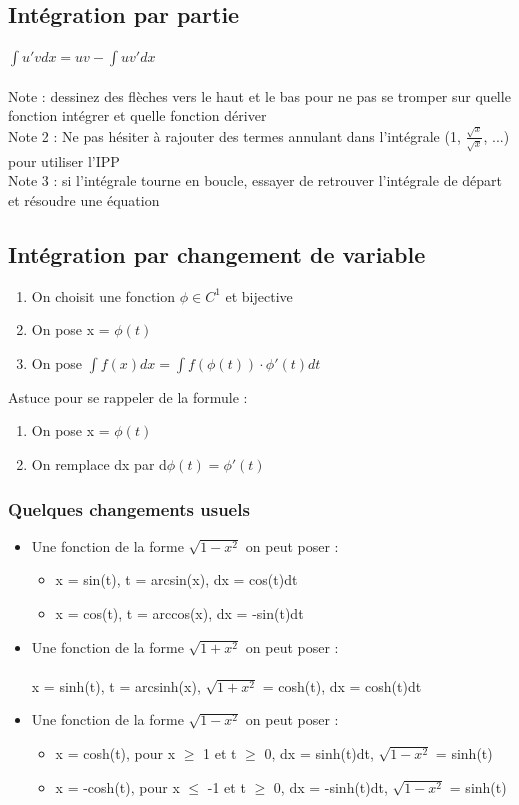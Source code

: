 \documentclass{article}
\begin{document}
\subsection{Intégration par partie}
$\int u'vdx = uv - \int uv'dx$\\\\
Note : dessinez des flèches vers le haut et le bas pour ne pas se tromper sur quelle fonction intégrer et quelle fonction dériver\\
Note 2 : Ne pas hésiter à rajouter des termes annulant dans l'intégrale (1, $\frac{\sqrt{x}}{\sqrt{x}}$, ...) pour utiliser l'IPP\\
Note 3 : si l'intégrale tourne en boucle, essayer de retrouver l'intégrale de départ et résoudre une équation

\subsection{Intégration par changement de variable}
\begin{enumerate}
    \item On choisit une fonction $\phi \in C^1$ et bijective
    \item On pose x = $\phi(t)$
    \item On pose $\int f(x)dx = \int f(\phi(t))\cdot\phi'(t)dt$
\end{enumerate}
Astuce pour se rappeler de la formule :
\begin{enumerate}
    \item On pose x = $\phi(t)$
    \item On remplace dx par d$\phi(t) = \phi'(t) $
\end{enumerate}
\subsubsection{Quelques changements usuels}
\begin{itemize}
    \item Une fonction de la forme $\sqrt{1 - x^2}$ on peut poser :
    \begin{itemize}
        \item x = sin(t), t = arcsin(x), dx = cos(t)dt
        \item x = cos(t), t = arccos(x), dx = -sin(t)dt
    \end{itemize}
    \item Une fonction de la forme $\sqrt{1 + x^2}$ on peut poser :\\\\
    x = sinh(t), t = arcsinh(x), $\sqrt{1 + x^2}$ = cosh(t), dx = cosh(t)dt
    \item Une fonction de la forme $\sqrt{1 - x^2}$ on peut poser :
    \begin{itemize}
        \item x = cosh(t), pour x $\geq$ 1 et t $\geq$ 0, dx = sinh(t)dt, $\sqrt{1 - x^2}$ = sinh(t)
        \item x = -cosh(t), pour x $\leq$ -1 et t $\geq$ 0, dx = -sinh(t)dt, $\sqrt{1 - x^2}$ = sinh(t)
    \end{itemize}
\end{itemize}
\end{document}
